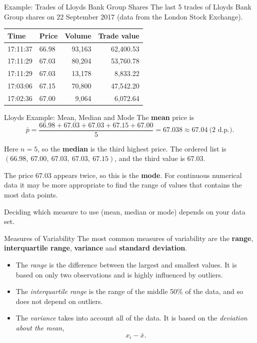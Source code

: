\documentclass[10pt,aspectratio=169]{beamer}
\begin{document}
\begin{frame}{Example: Trades of Lloyds Bank Group Shares}
  The last 5 trades of Lloyds Bank Group shares on 22 September 2017
  (data from the London Stock Exchange).

  \vspace{0.5em}
  \begin{center}
    \begin{tabular}{llrr}
      \toprule
      Time & Price & Volume & Trade value \\
      \midrule
      17:11:37 & 66.98 & 93,163 & 62,400.53 \\
      17:11:29 & 67.03 & 80,204 & 53,760.78 \\
      17:11:29 & 67.03 & 13,178 &  8,833.22 \\
      17:03:06 & 67.15 & 70,800 & 47,542.20 \\
      17:02:36 & 67.00 &  9,064 &  6,072.64 \\
      \bottomrule
    \end{tabular}
  \end{center}
\end{frame}

\begin{frame}{Lloyds Example: Mean, Median and Mode}
  The \textbf{mean} price is
  \[
    \bar{p} = \frac{66.98 + 67.03 + 67.03 + 67.15 + 67.00}{5}
            = 67.038 \approx 67.04 \ \text{(2 d.p.)}.
  \]

  Here $n = 5$, so the \textbf{median} is the third highest price. The ordered
  list is $(66.98,\ 67.00,\ 67.03,\ 67.03,\ 67.15)$, and the third value is
  $67.03$.

  The price $67.03$ appears twice, so this is the \textbf{mode}. For continuous
  numerical data it may be more appropriate to find the range of values that
  contains the most data points.

  \vspace{0.8em}
  Deciding which measure to use (mean, median or mode) depends on your data set.
\end{frame}

\begin{frame}{Measures of Variability}
  The most common measures of variability are the \textbf{range},
  \textbf{interquartile range}, \textbf{variance} and
  \textbf{standard deviation}.

  \begin{itemize}
    \item The \emph{range} is the difference between the largest and smallest
          values. It is based on only two observations and is highly influenced
          by outliers.
    \item The \emph{interquartile range} is the range of the middle 50\% of the
          data, and so does not depend on outliers.
    \item The \emph{variance} takes into account all of the data. It is based on
          the \emph{deviation about the mean},
          \[
            x_i - \bar{x}.
          \]
  \end{itemize}
\end{frame}
\end{document}
